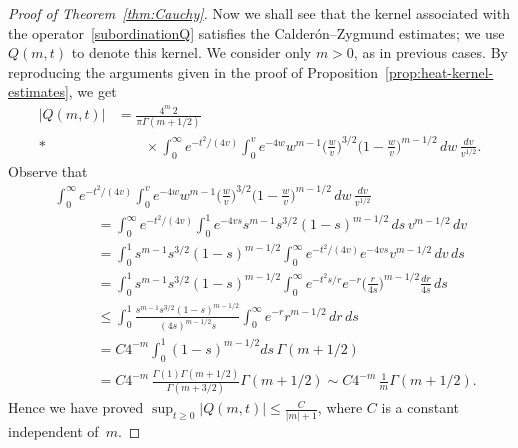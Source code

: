 \documentclass[11pt]{amsart}
\numberwithin{equation}{section}
\theoremstyle{plain}
\theoremstyle{remark}
\begin{document}
\begin{proof}[Proof of Theorem~\ref{thm:Cauchy}]
Now we shall see that the kernel associated with the operator~\eqref{subordinationQ} satisfies the Calder\'on--Zygmund estimates; we use $Q(m,t)$ to denote this kernel. We consider only $m>0$, as in previous cases. By reproducing the arguments given in the proof of Proposition~\ref{prop:heat-kernel-estimates},
we get
\begin{align*}
|Q(m,t)| &= \frac{4^m\,2}{\pi \Gamma(m+1/2)} \\*
&\qquad \times \int_0^\infty e^{-t^2/(4v)}
\int_0^v e^{-4w} w^{m-1} \Big( \frac{w}{v}\Big)^{3/2}
\Big(1-\frac{w}{v}\Big)^{m-1/2}\,dw\, \frac{dv}{v^{1/2}}.
\end{align*}
Observe that
\begin{align*}
&\int_0^\infty e^{-t^2/(4v)}
\int_0^v e^{-4w} w^{m-1} \Big(\frac{w}{v}\Big)^{3/2}
\Big(1-\frac{w}{v}\Big)^{m-1/2}\, dw \,\frac{dv}{v^{1/2}} \\
&\qquad\quad =
\int_0^\infty e^{-t^2/(4v)} \int_0^1 e^{-4vs} s^{m-1} s^{3/2}
{(1-s)}^{m-1/2}\,ds\, v^{m-1/2}\,dv \\
&\qquad\quad =
\int_0^1 s^{m-1} s^{3/2} {(1-s)}^{m-1/2}
\int_0^\infty e^{-t^2/(4v)} e^{-4vs} v^{m-1/2} \,dv \, ds \\
&\qquad\quad =
\int_0^1 s^{m-1} s^{3/2} {(1-s)}^{m-1/2}
\int_0^\infty e^{-t^2s/r} e^{-r} \Big( \frac{r}{4s}\Big)^{m-1/2} \frac{dr}{4s}\, ds \\
&\qquad\quad \le
\int_0^1\frac{ s^{m-1}s^{3/2} {(1-s)}^{m-1/2}}{(4s)^{m-1/2} s}
\int_0^\infty e^{-r} r^{m-1/2} \,dr \,ds \\
&\qquad\quad = C 4^{-m} \int_0^1 {(1-s)}^{m-1/2} ds \, \Gamma(m+1/2) \\
&\qquad\quad = C 4^{-m} \, \frac{\Gamma(1) \Gamma(m+1/2)}{\Gamma(m+3/2)} \Gamma(m+1/2)
\sim C 4^{-m} \, \frac1{m}  \Gamma(m+1/2).
\end{align*}
Hence we have proved $\sup_{t\ge0} |Q(m,t)| \le \frac{C}{|m|+1}$, where $C$ is a constant independent of~$m$.


\end{proof}
\end{document}

